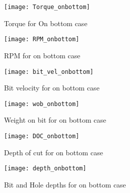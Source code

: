 \begin{figure}
  \centering
  \texttt{[image: Torque\_onbottom]}
  \caption{Torque for On bottom case}\label{torque_onbottom}
\end{figure}
\begin{figure}
  \centering
  \texttt{[image: RPM\_onbottom]}
  \caption{RPM for on bottom case}\label{RPM_onbottom}
\end{figure}
\begin{figure}
  \centering
  \texttt{[image: bit\_vel\_onbottom]}
  \caption{Bit velocity for on bottom case}\label{bit_vel_onbottom}
\end{figure}
\begin{figure}
  \centering
  \texttt{[image: wob\_onbottom]}
  \caption{Weight on bit for on bottom case}\label{wob_onbottom}
\end{figure}
\begin{figure}
  \centering
  \texttt{[image: DOC\_onbottom]}
  \caption{Depth of cut for on bottom case}\label{doc_onbottom}
\end{figure}
\begin{figure}
  \centering
  \texttt{[image: depth\_onbottom]}
  \caption{Bit and Hole depths for on bottom case}\label{depth_onbottom}
\end{figure}

